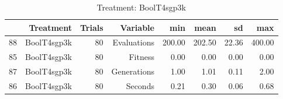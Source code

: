\begin{table}[ht]
\centering
\begin{tabular}{rrrrrrrr}
  \hline
 & Treatment & Trials & Variable & min & mean & sd & max \\ 
  \hline
88 & BoolT4sgp3k &  80 & Evaluations & 200.00 & 202.50 & 22.36 & 400.00 \\ 
  85 & BoolT4sgp3k &  80 & Fitness & 0.00 & 0.00 & 0.00 & 0.00 \\ 
  87 & BoolT4sgp3k &  80 & Generations & 1.00 & 1.01 & 0.11 & 2.00 \\ 
  86 & BoolT4sgp3k &  80 & Seconds & 0.21 & 0.30 & 0.06 & 0.68 \\ 
   \hline
\end{tabular}
\caption{Treatment: BoolT4sgp3k} 
\end{table}
